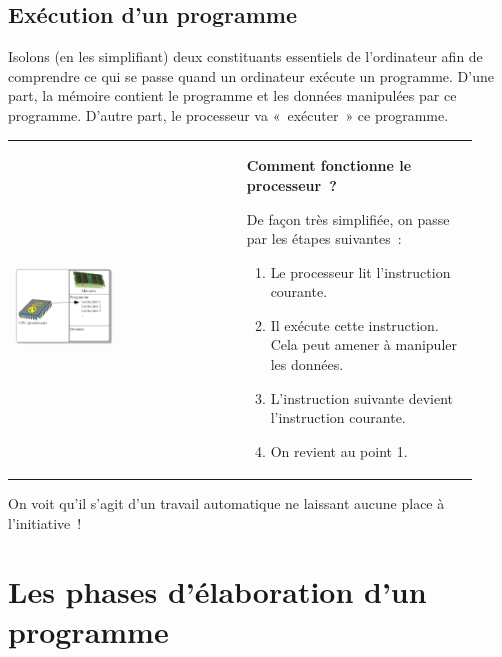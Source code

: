 	\subsection{Exécution d’un programme}

		Isolons (en les simplifiant) deux constituants essentiels de
		l’ordinateur afin de comprendre ce qui se passe quand
		un ordinateur exécute un programme. D’une part, la
		mémoire contient le programme et les données manipulées par ce
		programme. D’autre part, le processeur va «~exécuter~»
		ce programme.

		\begin{tabular}{m{0.46\linewidth}m{0.46\linewidth}}
			\begin{center}
			\includegraphics[width=0.45\textwidth]{image/intro-schema-ordi}
			\end{center}
		&
			\textbf{Comment fonctionne le processeur~?}
	
			De façon très simplifiée, on passe par les étapes suivantes~:
	
			\medskip
			\begin{flushleft}
			\begin{enumerate}
			\item Le processeur lit l’instruction courante.
			\item Il exécute cette instruction. Cela peut amener à manipuler les données.
			\item L’instruction suivante devient l’instruction courante.
			\item On revient au point 1.
			\end{enumerate}
			\end{flushleft}
		\\
		\end{tabular}

		On voit qu’il s’agit d’un travail
		automatique ne laissant aucune place à l’initiative~!

\section{Les phases d’élaboration d’un programme}

